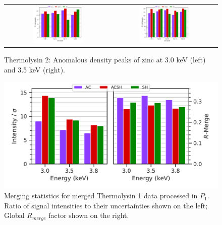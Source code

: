 \begin{figure}
    \centering
    \begin{tabular}{cc}
        \includegraphics[width = 0.5\textwidth]{plots/exp1/tlys_2_P6122/peaks/3p0_zinc.pdf} & \includegraphics[width = 0.5\textwidth]{plots/exp1/tlys_2_P6122/peaks/3p5_zinc.pdf}
    \end{tabular}
    \caption{Thermolysin 2: Anomalous density peaks of zinc at 3.0 \unit{keV} (left) and 3.5 \unit{keV} (right).}
    \label{fig:tlys2_zn_peaks}
\end{figure}



\begin{figure}[]
    \centering
    \includegraphics{plots/exp1/tlys_9_P1/merged_stats.pdf}
    \caption{Merging statistics for merged Thermolysin 1 data processed in $P_1$. Ratio of signal intensities to their uncertainties shown on the left; Global $R_{merge}$ factor shown on the right.}
    \label{fig:tlys_9_p1}
\end{figure}

